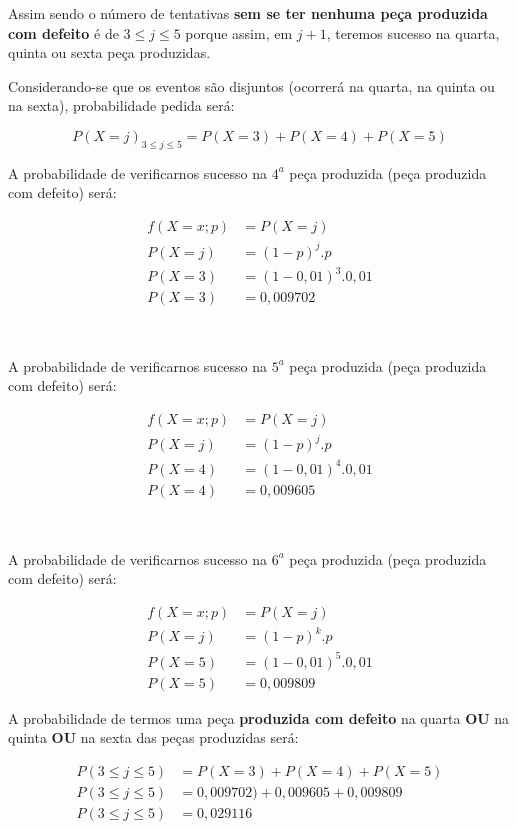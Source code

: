 \documentclass[
]{book}
\begin{document}
Assim sendo o número de tentativas \textbf{sem se ter nenhuma peça produzida com defeito} é de \(3 \leq j \leq 5\) porque assim, em \(j+1\), teremos sucesso na quarta, quinta ou sexta peça produzidas.

\hfill\break

Considerando-se que os eventos são disjuntos (ocorrerá na quarta, na quinta ou na sexta), probabilidade pedida será:

\[
P(X=j)_{3 \leq j \leq 5}= P(X=3) + P(X=4) + P(X=5)
\]

\hfill\break

A probabilidade de verificarnos sucesso na \(4^{a}\) peça produzida (peça produzida com defeito) será:

\hfill\break

\begin{align*}
f(X=x; p) & = P(X=j) \\
P(X=j)    & = (1-p)^{j} . p  \\
P(X=3)    & = (1-0,01)^{3} . 0,01 \\
P(X=3)    & = 0,009702
\end{align*}

~

A probabilidade de verificarnos sucesso na \(5^{a}\) peça produzida (peça produzida com defeito) será:

\begin{align*}
f(X=x; p) & = P(X=j) \\
P(X=j)    & = (1-p)^{j} . p \\
P(X=4)    & = (1-0,01)^{4} . 0,01 \\
P(X=4)   & = 0,009605
\end{align*}

~

A probabilidade de verificarnos sucesso na \(6^{a}\) peça produzida (peça produzida com defeito) será:

\begin{align*}
f(X=x; p) & = P(X=j) \\
P(X=j)   & = (1-p)^{k} . p \\
P(X=5)    & = (1-0,01)^{5} . 0,01 \\
P(X=5)    & = 0,009809    
\end{align*}

\hfill\break

A probabilidade de termos uma peça \textbf{produzida com defeito} na quarta \textbf{OU} na quinta \textbf{OU} na sexta das peças produzidas será:

\begin{align*}
P(3 \leq j \leq 5)  &  = P(X=3) + P(X=4) + P(X=5) \\
P(3 \leq j \leq 5)  &  = 0,009702) + 0,009605 + 0,009809 \\
P(3 \leq j \leq 5)  &  = 0,029116 
\end{align*}
\end{document}
